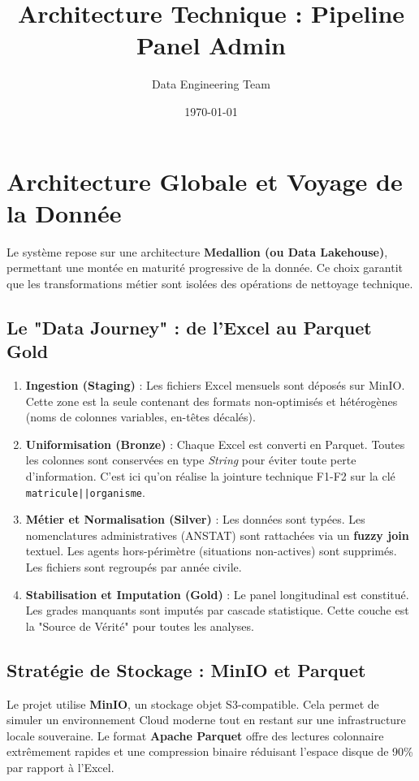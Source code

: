 \documentclass[12pt,a4paper,french]{report}
\title{Architecture Technique : Pipeline Panel Admin}
\author{Data Engineering Team}
\date{\today}
\begin{document}
\maketitle
\tableofcontents
\newpage

\chapter{Architecture Globale et Voyage de la Donnée}

Le système repose sur une architecture \textbf{Medallion (ou Data Lakehouse)}, permettant une montée en maturité progressive de la donnée. Ce choix garantit que les transformations métier sont isolées des opérations de nettoyage technique.

\section{Le "Data Journey" : de l'Excel au Parquet Gold}

\begin{enumerate}
    \item \textbf{Ingestion (Staging)} : Les fichiers Excel mensuels sont déposés sur MinIO. Cette zone est la seule contenant des formats non-optimisés et hétérogènes (noms de colonnes variables, en-têtes décalés).
    \item \textbf{Uniformisation (Bronze)} : Chaque Excel est converti en Parquet. Toutes les colonnes sont conservées en type \textit{String} pour éviter toute perte d'information. C'est ici qu'on réalise la jointure technique F1-F2 sur la clé \texttt{matricule||organisme}.
    \item \textbf{Métier et Normalisation (Silver)} : Les données sont typées. Les nomenclatures administratives (ANSTAT) sont rattachées via un \textbf{fuzzy join} textuel. Les agents hors-périmètre (situations non-actives) sont supprimés. Les fichiers sont regroupés par année civile.
    \item \textbf{Stabilisation et Imputation (Gold)} : Le panel longitudinal est constitué. Les grades manquants sont imputés par cascade statistique. Cette couche est la "Source de Vérité" pour toutes les analyses.
\end{enumerate}

\section{Stratégie de Stockage : MinIO et Parquet}

Le projet utilise \textbf{MinIO}, un stockage objet S3-compatible. Cela permet de simuler un environnement Cloud moderne tout en restant sur une infrastructure locale souveraine.
Le format \textbf{Apache Parquet} offre des lectures colonnaire extrêmement rapides et une compression binaire réduisant l'espace disque de 90\% par rapport à l'Excel.
\end{document}
